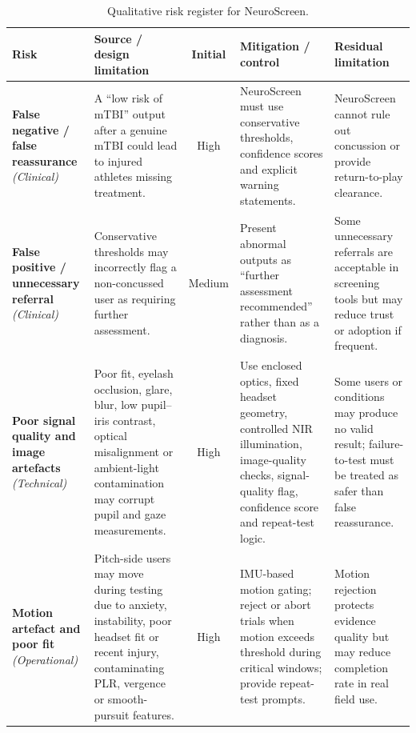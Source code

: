 \begin{table}[htbp]
    \centering
    \caption{Qualitative risk register for NeuroScreen.}
    \label{tab:risk-register}
    \footnotesize
    \begin{tabular}{p{2.6cm}p{3.6cm}cp{4cm}p{3.4cm}}
        \toprule
        \textbf{Risk} & \textbf{Source / design limitation} & \textbf{Initial} & \textbf{Mitigation / control} & \textbf{Residual limitation} \\
        \midrule
        \textbf{False negative / false reassurance} \emph{(Clinical)}
            & A ``low risk of mTBI'' output after a genuine mTBI could lead to injured athletes missing treatment.
            & High
            & NeuroScreen must use conservative thresholds, confidence scores and explicit warning statements.
            & NeuroScreen cannot rule out concussion or provide return-to-play clearance. \\
        \midrule
        \textbf{False positive / unnecessary referral} \emph{(Clinical)}
            & Conservative thresholds may incorrectly flag a non-concussed user as requiring further assessment.
            & Medium
            & Present abnormal outputs as ``further assessment recommended'' rather than as a diagnosis.
            & Some unnecessary referrals are acceptable in screening tools but may reduce trust or adoption if frequent. \\
        \midrule
        \textbf{Poor signal quality and image artefacts} \emph{(Technical)}
            & Poor fit, eyelash occlusion, glare, blur, low pupil--iris contrast, optical misalignment or ambient-light contamination may corrupt pupil and gaze measurements.
            & High
            & Use enclosed optics, fixed headset geometry, controlled NIR illumination, image-quality checks, signal-quality flag, confidence score and repeat-test logic.
            & Some users or conditions may produce no valid result; failure-to-test must be treated as safer than false reassurance. \\
        \midrule
        \textbf{Motion artefact and poor fit} \emph{(Operational)}
            & Pitch-side users may move during testing due to anxiety, instability, poor headset fit or recent injury, contaminating PLR, vergence or smooth-pursuit features.
            & High
            & IMU-based motion gating; reject or abort trials when motion exceeds threshold during critical windows; provide repeat-test prompts.
            & Motion rejection protects evidence quality but may reduce completion rate in real field use. \\

\end{tabular}
\end{table}
